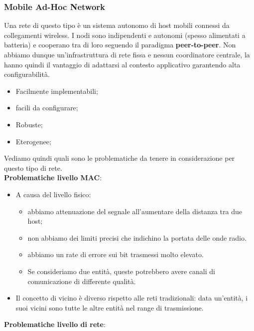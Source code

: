 \documentclass[12pt]{article}
\begin{document}
		\subsubsection{Mobile Ad-Hoc Network}
			Una rete di questo tipo è un sistema autonomo di host mobili connessi da collegamenti wireless. I nodi sono indipendenti e autonomi (spesso alimentati a batteria) e cooperano tra di loro seguendo il paradigma \textbf{peer-to-peer}. Non abbiamo dunque un'infrastruttura di rete fissa e nessun coordinatore centrale, la hanno quindi il vantaggio di adattarsi al contesto applicativo garantendo alta configurabilità.
			\begin{itemize}
				\item Facilmente implementabili; 
				\item facili da configurare;
				\item Robuste;
				\item Eterogenee;
			\end{itemize}
			Vediamo quindi quali sono le problematiche da tenere in considerazione per questo tipo di rete.\\
			\textbf{Problematiche livello MAC}:
			\begin{itemize}
				\item A causa del livello fisico:
				\begin{itemize}
					\item abbiamo attenuazione del segnale all'aumentare della distanza tra due host;
					\item non abbiamo dei limiti precisi che indichino la portata delle onde radio.
					\item abbiamo un rate di errore sui bit trasmessi molto elevato.
					\item Se consideriamo due entità, queste potrebbero avere canali di comunicazione di differente qualità.
				\end{itemize} 
				\item Il concetto di vicino è diverso rispetto alle reti tradizionali: data un'entità, i suoi vicini sono tutte le altre entità nel range di trasmissione.	
			\end{itemize}
			\textbf{Problematiche livello di rete}:
\end{document}
